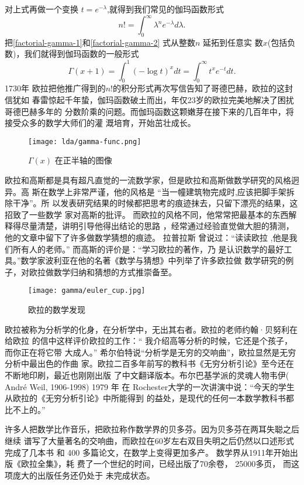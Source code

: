 {对上式再做一个变换 $t=e^{-\lambda}$,就得到我们常见的伽玛函数形式
\begin{equation}
\label{factorial-gamma-2}
 n! = \int_0^{\infty} \lambda^ne^{-\lambda}d\lambda .
\end{equation}
把\eqref{factorial-gamma-1}和\eqref{factorial-gamma-2} 式从整数$n$ 延拓到任意实
数$x$(包括负数)，我们就得到伽玛函数的一般形式
$$ \Gamma(x+1) = \int_0^1 (-\log t)^{x}dt =  \int_0^{\infty} t^{x}e^{-t}dt .$$
1730年 欧拉把他推广得到的$n!$的积分形式再次写信告知了哥德巴赫，欧拉的这封信犹如
春雷惊起千年蛰，伽玛函数破土而出，年仅23岁的欧拉完美地解决了困扰哥德巴赫多年的
分数阶乘的问题。而伽玛函数这颗嫩芽在接下来的几百年中，将接受众多的数学大师们的灌
溉培育，开始茁壮成长。 

\begin{figure}[htbp]
\centering
\texttt{[image: lda/gamma-func.png]}
\caption{$\Gamma(x)$ 在正半轴的图像}
\end{figure}

欧拉和高斯都是具有超凡直觉的一流数学家，但是欧拉和高斯做数学研究的风格迥异。高
斯在数学上非常严谨，他的风格是 “当一幢建筑物完成时,应该把脚手架拆除干净”。所
以发表研究结果的时候都把思考的痕迹抹去，只留下漂亮的结果，这招致了一些数学
家对高斯的批评。
而欧拉的风格不同，他常常把最基本的东西解释得尽量清楚，讲明引导他得出结论的思路
，经常通过经验直觉做大胆的猜测，他的文章中留下了许多做数学猜想的痕迹。 拉普拉斯
曾说过：“读读欧拉 ,他是我们所有人的老师。”
而高斯的评价是：“学习欧拉的著作，乃
是认识数学的最好工具。”数学家波利亚在他的名著《数学与猜想》中列举了许多欧拉做
数学研究的例子，对欧拉做数学归纳和猜想的方式推崇备至。

\begin{figure}[htbp]
\centering
\texttt{[image: gamma/euler\_cup.jpg]}
\caption{欧拉的数学发现}
\end{figure}

欧拉被称为分析学的化身，在分析学中，无出其右者。欧拉的老师约翰·贝努利在给欧拉
的信中这样评价欧拉的工作：“ 我介绍高等分析的时候，它还是个孩子，而你正在将它带
大成人。” 希尔伯特说“分析学是无穷的交响曲”，欧拉显然是无穷分析中最出色的作曲
家。欧拉二百多年前写的教科书《无穷分析引论》至今还在不断地印刷，最近也刚刚出版
了中文翻译版本。布尔巴基学派的灵魂人物韦伊( Andr\'{e} Weil, 1906-1998) 1979 年
在 Rochester大学的一次讲演中说：“今天的学生从欧拉的《无穷分析引论》中所能得到
的益处，是现代的任何一本数学教科书都比不上的。”

许多人把数学比作音乐，把欧拉称作数学界的贝多芬。因为贝多芬在两耳失聪之后继续
谱写了大量著名的交响曲，而欧拉在60岁左右双目失明之后仍然以口述形式完成了几本书
和 400 多篇论文，在数学上变得更加多产。 数学界从1911年开始出版《欧拉全集》，耗
费了一个世纪的时间，已经出版了70余卷， 25000多页， 而这项庞大的出版任务还仍处于
未完成状态。

}
